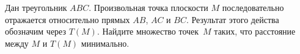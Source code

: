 \begin{problems}

\item
Дан треугольник $ABC$.
Произвольная точка плоскости $M$ последовательно отражается относительно прямых
$AB$, $AC$ и $BC$.
Результат этого действа обозначим через $T(M)$.
Найдите множество точек~$M$ таких, что расстояние между $M$ и $T(M)$
минимально.

\end{problems}

